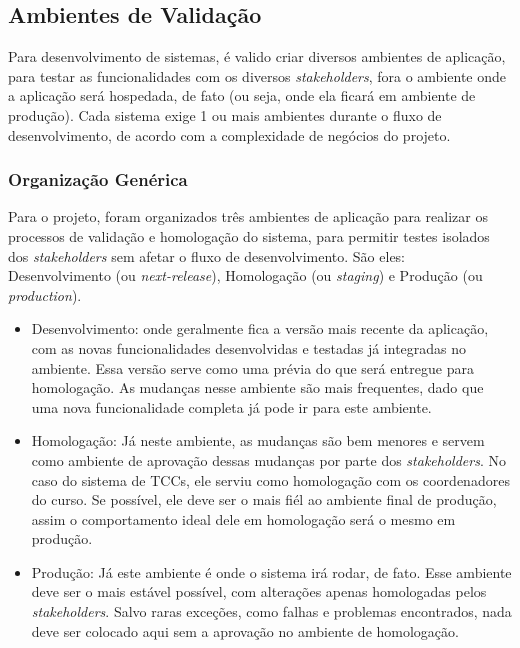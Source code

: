 \subsection{Ambientes de Validação}
Para desenvolvimento de sistemas, é valido criar diversos ambientes de aplicação, para testar as funcionalidades com os diversos \textit{stakeholders}, fora o ambiente onde a aplicação será hospedada, de fato (ou seja, onde ela ficará em ambiente de produção). Cada sistema exige 1 ou mais ambientes durante o fluxo de desenvolvimento, de acordo com a complexidade de negócios do projeto.

\subsubsection{Organização Genérica}
Para o projeto, foram organizados três ambientes de aplicação para realizar os processos de validação e homologação do sistema, para permitir testes isolados dos \textit{stakeholders} sem afetar o fluxo de desenvolvimento. São eles: Desenvolvimento (ou \textit{next-release}), Homologação (ou \textit{staging}) e Produção (ou \textit{production})\cite{tracyragan2017}.

\begin{itemize}
    \item Desenvolvimento: onde geralmente fica a versão mais recente da aplicação, com as novas funcionalidades desenvolvidas e testadas já integradas no ambiente. Essa versão serve como uma prévia do que será entregue para homologação. As mudanças nesse ambiente são mais frequentes, dado que uma nova funcionalidade completa já pode ir para este ambiente.

    \item Homologação: Já neste ambiente, as mudanças são bem menores e servem como ambiente de aprovação dessas mudanças por parte dos \textit{stakeholders}. No caso do sistema de TCCs, ele serviu como homologação com os coordenadores do curso. Se possível, ele deve ser o mais fiél ao ambiente final de produção, assim o comportamento ideal dele em homologação será o mesmo em produção.

    \item Produção: Já este ambiente é onde o sistema irá rodar, de fato. Esse ambiente deve ser o mais estável possível, com alterações apenas homologadas pelos \textit{stakeholders}. Salvo raras exceções, como falhas e problemas encontrados, nada deve ser colocado aqui sem a aprovação no ambiente de homologação.
\end{itemize}


